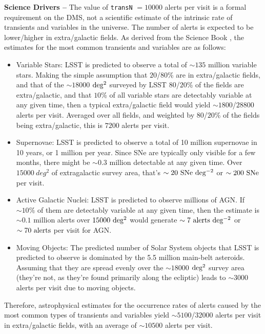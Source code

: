 \documentclass[DM,authoryear,toc]{lsstdoc}
\begin{document}
{\bf Science Drivers --} The value of {\tt transN} $=10000$ alerts per visit is a formal requirement on the DMS, not a scientific estimate of the intrinsic rate of transients and variables in the universe. The number of alerts is expected to be lower/higher in extra/galactic fields. As derived from the Science Book \citep{2009arXiv0912.0201L}, the estimates for the most common transients and variables are as follows:
\begin{itemize}
\item Variable Stars: LSST is predicted to observe a total of $\sim135$ million variable stars. Making the simple assumption that $20$/$80$\% are in extra/galactic fields, and that of the $\sim18000$ $\rm deg^2$ surveyed by LSST $80$/$20$\% of the fields are extra/galactic, and that $10$\% of all variable stars are detectably variable at any given time, then a typical extra/galactic field would yield $\sim1800$/$28800$ alerts per visit. Averaged over all fields, and weighted by $80$/$20$\% of the fields being extra/galactic, this is $7200$ alerts per visit.
\item Supernovae: LSST is predicted to observe a total of 10 million supernovae in 10 years, or 1 million per year. Since SNe are typically only visible for a few months, there might be $\sim0.3$ million detectable at any given time. Over $15000\ deg^{2}$ of extragalactic survey area, that's $\sim20\ {\rm SNe\ deg^{-2}}$ or $\sim200\ {\rm SNe}$ per visit.
\item Active Galactic Nuclei: LSST is predicted to observe millions of AGN. If $\sim10\%$ of them are detectably variable at any given time, then the estimate is $\sim0.1$ million alerts over $15000\ {\rm deg^2}$ would generate $\sim7\ {\rm alerts\ deg^{-2}}$ or $\sim70\ {\rm alerts}$ per visit for AGN.
\item Moving Objects: The predicted number of Solar System objects that LSST is predicted to observe is dominated by the 5.5 million main-belt asteroids. Assuming that they are spread evenly over the $\sim18000$ $\rm deg^2$ survey area (they're not, as they're found primarily along the ecliptic) leads to $\sim3000$ alerts per visit due to moving objects.
\end{itemize} 
Therefore, astrophysical estimates for the occurrence rates of alerts caused by the most common types of transients and variables yield $\sim5100$/$32000$ alerts per visit in extra/galactic fields, with an average of $\sim10500$ alerts per visit.
\end{document}
